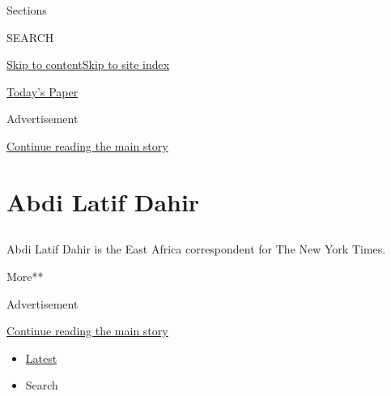 Sections

SEARCH

\protect\hyperlink{site-content}{Skip to
content}\protect\hyperlink{site-index}{Skip to site index}

\href{https://myaccount.nytimes.com/auth/login?response_type=cookie\&client_id=vi}{}

\href{https://www.nytimes.com/section/todayspaper}{Today's Paper}

Advertisement

\protect\hyperlink{after-top}{Continue reading the main story}

\hypertarget{abdi-latif-dahir}{%
\section{Abdi Latif Dahir}\label{abdi-latif-dahir}}

\subsection{}

Abdi Latif Dahir is the East Africa correspondent for The New York
Times.

More**

Advertisement

\protect\hyperlink{after-mid1}{Continue reading the main story}

\begin{itemize}
\tightlist
\item
  \protect\hyperlink{stream-panel}{Latest}
\item
  Search
\end{itemize}

